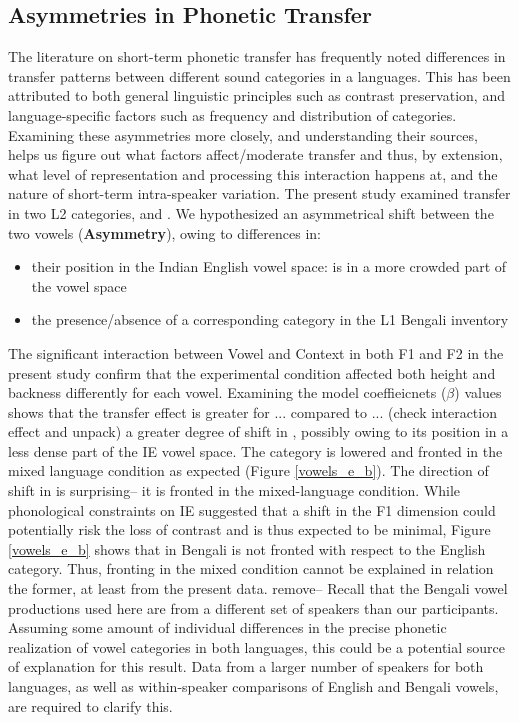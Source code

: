 \documentclass[12 pt]{article}
\newcommand{\nt}[1]{\textipa{[#1]}} %
\begin{document}
\subsection{Asymmetries in Phonetic Transfer}
The literature on short-term phonetic transfer has frequently noted differences in transfer patterns between different sound categories in a languages. This has been attributed to both general linguistic principles such as contrast preservation, and language-specific factors such as frequency and distribution of categories. Examining these asymmetries more closely, and understanding their sources, helps us figure out what factors affect/moderate transfer and thus, by extension, what level of representation and processing this interaction happens at, and the nature of short-term intra-speaker variation. 
The present study examined transfer in two L2 categories, \nt{2} and \nt{\ae}. We hypothesized an asymmetrical shift between the two vowels (\textbf{Asymmetry}), owing to differences in:
 \begin{itemize}
 	\item their position in the Indian English vowel space: \nt{\ae} is in a more crowded part of the vowel space
 	\item the presence/absence of a corresponding category in the L1 Bengali inventory
 \end{itemize}

The significant interaction between Vowel and Context in both F1 and F2 in the present study confirm that the experimental condition affected both height and backness differently for each vowel. Examining the model coeffieicnets ($\beta$) values shows that the transfer effect is greater for ... compared to ...   (\alert{check interaction effect and unpack}) a greater degree of shift in \nt{2}, possibly owing to its position in a less dense part of the IE vowel space. The category \nt{2} is lowered and fronted in the mixed language condition as expected (Figure \ref{vowels_e_b}). The direction of shift in \nt{\ae} is surprising-- it is fronted in the mixed-language condition. While phonological constraints on IE suggested that a shift in the F1 dimension could potentially risk the loss of contrast and is thus expected to be minimal, Figure \ref{vowels_e_b} shows that \nt{\ae} in Bengali is not fronted with respect to the English category. Thus, fronting in the mixed condition cannot be explained in relation the former, at least from the present data. \alert{remove-- Recall that the Bengali vowel productions used here are from a different set of speakers than our participants. Assuming some amount of individual differences in the precise phonetic realization of vowel categories in both languages, this could be a potential source of explanation for this result.} Data from a larger number of speakers for both languages, as well as within-speaker comparisons of English and Bengali vowels, are required to clarify this. 
\end{document}
